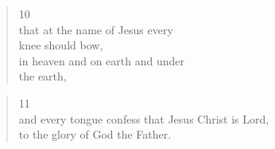 \documentclass[11pt,a4paper]{scrartcl} %
\begin{document}
\begin{verse}
10\\ that at the name of Jesus every\\ knee should bow,\\ in heaven and on earth and under\\ the earth,
\end{verse}
\begin{verse}
11\\ and every tongue confess that Jesus Christ is Lord,\\ to the glory of God the Father.
\end{verse} 

\clearpage
\title{\textcolor{Maroon}{\rmfamily\normalfont{}}}
    \author{\textcolor{brown}{}}
    \date{} %
    
    \maketitle
    
    \begin{abstract}
  
    \end{abstract}
       
    \tableofcontents
    
    \section{}

    \nocite{*}
    
    
\end{document}
